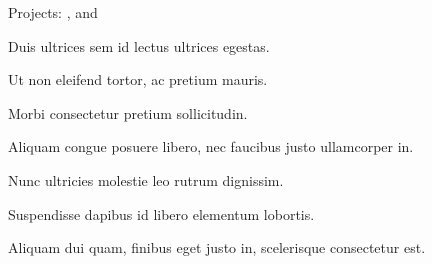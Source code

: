 \documentclass[]{deedy-resume-openfont}
\begin{document}
\begin{minipage}[t]{0.66\textwidth}
\begin{tightemize}
\item Projects: 
    \href{https://goo.gl/R@ND0M}{}, 
    \href{https://goo.gl/R@ND0M}{} and 
    \href{https://goo.gl/R@ND0M}{}
\item Duis ultrices sem id lectus ultrices egestas. 
\item Ut non eleifend tortor, ac pretium mauris.
\item  Morbi consectetur pretium sollicitudin. 
\item Aliquam congue posuere libero, nec faucibus justo ullamcorper in.
\end{tightemize}
\sectionsep

\begin{tightemize}
\item Nunc ultricies molestie leo rutrum dignissim. 
\item Suspendisse dapibus id libero elementum lobortis.
\item Aliquam dui quam, finibus eget justo in, scelerisque consectetur est.
\end{tightemize}
\sectionsep

%


\end{minipage}
\end{document}
